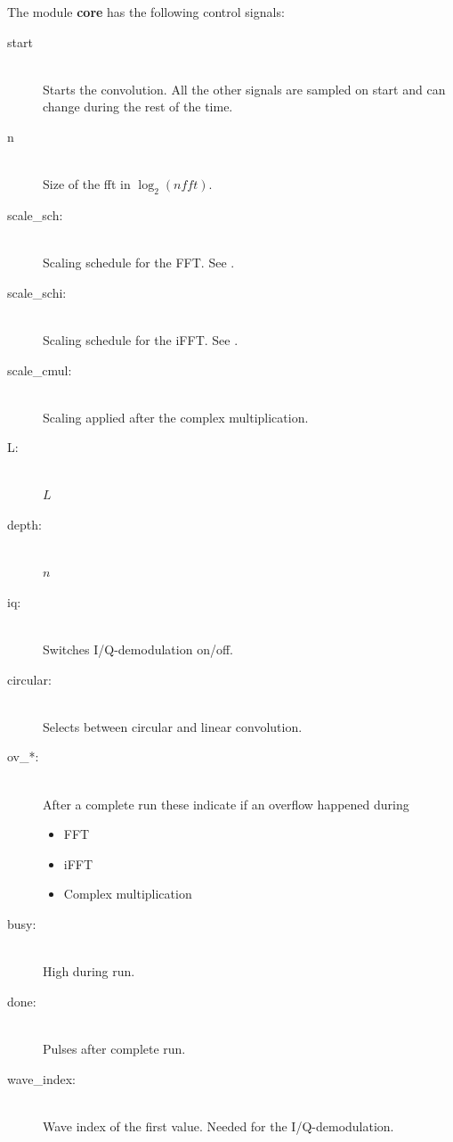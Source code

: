\documentclass[11pt,technote,a4paper,onecolumn,dvips]{IEEEtran}
\newcommand{\signal}[1]{{\ttfamily #1}}
\newcommand{\module}[1]{{\ttfamily\bfseries #1}}
\begin{document}
The module \module{core} has the following control signals:
\begin{description}
    \item[\signal{start}] \hfill \\
        Starts the convolution. All the other signals are sampled on
        \signal{start} and can change during the rest of the time.
    \item[\signal{n}] \hfill \\
        Size of the fft in $\log_2\left( nfft \right)$.
    \item[\signal{scale\_sch}:] \hfill \\
        Scaling schedule for the FFT. See \cite{xilinx_fft}.
    \item[\signal{scale\_schi}:] \hfill \\
        Scaling schedule for the iFFT. See \cite{xilinx_fft}.
    \item[\signal{scale\_cmul}:] \hfill \\
        Scaling applied after the complex multiplication.
    \item[\signal{L}:] \hfill \\
        $L$
    \item[\signal{depth}:] \hfill \\
        $n$
    \item[\signal{iq}:] \hfill \\
        Switches I/Q-demodulation on/off.
    \item[\signal{circular}:] \hfill \\
        Selects between circular and linear convolution.
    \item[\signal{ov\_*}:] \hfill \\
        After a complete run these indicate if an overflow happened during
        \begin{itemize}
            \item FFT
            \item iFFT
            \item Complex multiplication
        \end{itemize}
    \item[\signal{busy}:] \hfill \\
        High during run.
    \item[\signal{done}:] \hfill \\
        Pulses after complete run.
    \item[\signal{wave\_index}:] \hfill \\
        Wave index of the first value. Needed for the I/Q-demodulation.
\end{description}
\end{document}
